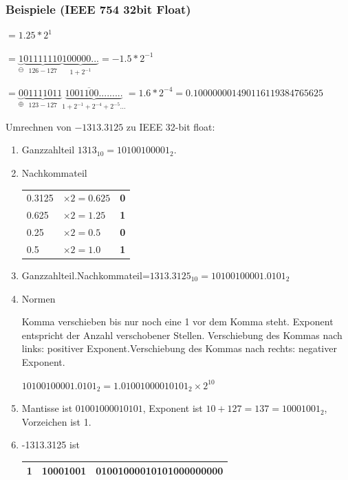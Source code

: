 \documentclass[a4paper,10pt]{article}
\newcommand{\Bold}[1]{\textbf{#1}} %
\begin{document}
\subsubsection{Beispiele (IEEE 754 32bit Float)}
\begin{description}
	\item[2.5] $=1.25*2^1$
	\item[-0.75] $=\underbrace{1}_{\ominus}\underbrace{01111110}_{126 - 127} \underbrace{100000...}_{1+2^{-1}}=-1.5*2^{-1}$
	\item[0.1] $=\underbrace{0}_{\oplus}\underbrace{01111011}_{123 - 127} \underbrace{100\overline{1100}.........}_{1+2^{-1}+2^{-4}+2^{-5}...}=1.6*2^{-4} = 0.100000001490116119384765625$ 
	\item Umrechnen von $-1313.3125$ zu IEEE 32-bit float:
	\begin{enumerate}
		\item Ganzzahlteil $1313_{10}=10100100001_2.$
		\item Nachkommateil\\
		\begin{tabular}{lll}
			0.3125&$\times2=0.625$& \Bold{0}\\
			0.625&$\times 2=1.25$ &\Bold{1}\\
			0.25&$\times 2 = 0.5$ &\Bold{0}\\
			0.5&$\times 2=1.0$ &\Bold{1}\\
		\end{tabular}
		\item Ganzzahlteil$.$Nachkommateil=$1313.3125_{10}=10100100001.0101_2$
		\item Normen \begin{flushleft}
		Komma verschieben bis nur noch eine 1 vor dem Komma steht. Exponent entspricht der Anzahl verschobener Stellen. \linebreak Verschiebung des Kommas nach links: positiver Exponent.\linebreak Verschiebung des Kommas nach rechts: negativer Exponent. \end{flushleft} $10100100001.0101_2=1.01001000010101_2\times2^{10}$
		\item Mantisse ist $01001000010101$, Exponent ist $10 + 127 = 137 = 10001001_2$, Vorzeichen ist 1.
		\item -1313.3125 ist 
		\begin{tabular}{|c|l|l|}
			\hline
			1 & 10001001 & 01001000010101000000000 \\
			\hline
		\end{tabular}
	\end{enumerate} 
\end{description}
\end{document}
